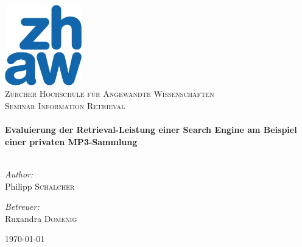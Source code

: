 \begin{titlepage}
\begin{center}
\includegraphics[width=0.25\textwidth]{img/zhaw.png}\\[0.5cm]
\textsc{\Large Zürcher Hochschule für Angewandte Wissenschaften}\\[1.0cm]
\textsc{\Large Seminar Information Retrieval}\\[1.5cm]

\hrulefill \\[0.5cm]
{\huge \bfseries Evaluierung der Retrieval-Leistung einer Search Engine am Beispiel einer privaten MP3-Sammlung}\\[0.4cm]
\hrulefill \\[0.5cm]
\begin{minipage}{0.4\textwidth}
\begin{flushleft}
\emph{Author:}\\
Philipp \textsc{Schalcher}
\end{flushleft}
\end{minipage}
\begin{minipage}{0.4\textwidth}
\begin{flushright}
\emph{Betreuer:}\\
Ruxandra \textsc{Domenig}
\end{flushright}
\end{minipage}

\vfill

{\large \today}

\end{center}
\end{titlepage}
